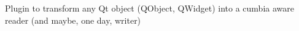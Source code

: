 Plugin to transform any Qt object (Q\+Object, Q\+Widget) into a cumbia aware reader (and maybe, one day, writer) 
